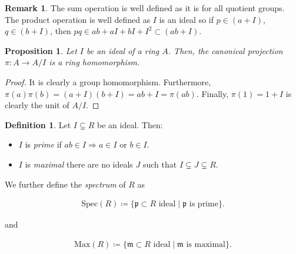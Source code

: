 \documentclass[11pt]{article}
\newtheorem{prop}[theorem]{Proposition}
\theoremstyle{definition}
\newtheorem{defn}[theorem]{Definition}
\newtheorem{rk}[theorem]{Remark}
\begin{document}
        \begin{rk}
            The sum operation is well defined as it is for all quotient groups.
            The product operation is well defined as $I$ is an ideal so if $p \in (a + I)$, $q \in (b + I)$,
            then $pq \in ab + aI + bI + I^2 \subset (ab + I)$.
        \end{rk}

        \begin{prop}
            Let $I$ be an ideal of a ring $A$.
            Then, the canonical projection $\pi: A \rightarrow A/I$ is a ring homomorphism.
        \end{prop}

                \begin{proof}
                    It is clearly a group homomorphism.
                    Furthermore, $\pi(a) \pi(b) = (a + I) (b + I) = ab + I = \pi(ab)$.
                    Finally, $\pi(1) = 1 + I$ is clearly the unit of $A/I$.
                \end{proof}

        \begin{defn}
            Let $I \subsetneq R$ be an ideal.
            Then:

            \begin{itemize}
                \item $I$ is \emph{prime} if $ab \in I \Rightarrow a \in I \text{ or } b \in I$.
                \item $I$ is \emph{maximal} there are no ideals $J$ such that $I \subsetneq J \subsetneq R$.
            \end{itemize}

            We further define the \emph{spectrum} of $R$ as

            \begin{align}
                \text{Spec}(R) \coloneqq \{\mathfrak{p} \subset R \text{ ideal} \mid \mathfrak{p} \text{ is prime}\}. \nonumber
            \end{align}

            and

            \begin{align}
                \text{Max}(R) \coloneqq \{\mathfrak{m} \subset R \text{ ideal} \mid \mathfrak{m} \text{ is maximal}\}. \nonumber
            \end{align}

        \end{defn}
\end{document}

